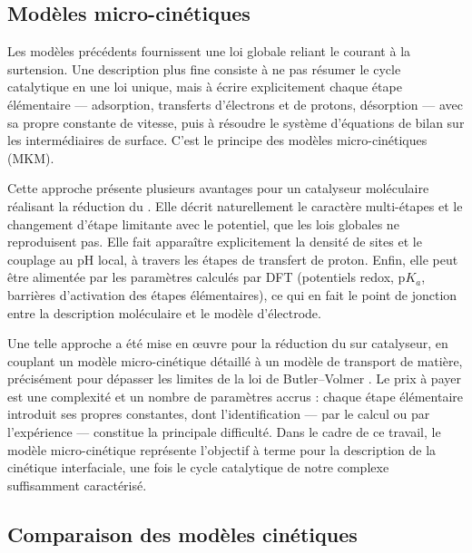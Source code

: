 \subsection*{Modèles micro-cinétiques}

Les modèles précédents fournissent une loi globale reliant le courant à la
surtension. Une description plus fine consiste à ne pas résumer le cycle
catalytique en une loi unique, mais à écrire explicitement chaque étape
élémentaire — adsorption, transferts d'électrons et de protons, désorption —
avec sa propre constante de vitesse, puis à résoudre le système d'équations de
bilan sur les intermédiaires de surface. C'est le principe des modèles
micro-cinétiques (MKM).

Cette approche présente plusieurs avantages pour un catalyseur moléculaire
réalisant la réduction du . Elle décrit naturellement le caractère
multi-étapes et le changement d'étape limitante avec le potentiel, que les
lois globales ne reproduisent pas. Elle fait apparaître explicitement la
densité de sites et le couplage au pH local, à travers les étapes de transfert
de proton. Enfin, elle peut être alimentée par les paramètres calculés par
DFT (potentiels redox, $\mathrm{p}K_a$, barrières d'activation des étapes
élémentaires), ce qui en fait le point de jonction entre la description
moléculaire et le modèle d'électrode.

Une telle approche a été mise en \oe uvre pour la réduction du  sur
catalyseur, en couplant un modèle micro-cinétique détaillé à un modèle de
transport de matière, précisément pour dépasser les limites de la loi de
Butler--Volmer \cite{adesinaButlerVolmerEquationCO22024}. Le prix à payer est
une complexité et un nombre de paramètres accrus : chaque étape élémentaire
introduit ses propres constantes, dont l'identification — par le calcul ou par
l'expérience — constitue la principale difficulté. Dans le cadre de ce
travail, le modèle micro-cinétique représente l'objectif à terme pour la
description de la cinétique interfaciale, une fois le cycle catalytique de
notre complexe suffisamment caractérisé.

\subsection*{Comparaison des modèles cinétiques}

